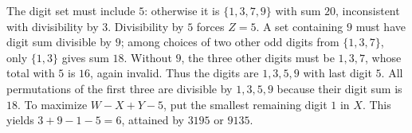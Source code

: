 The digit set must include $5$: otherwise it is $\{1,3,7,9\}$ with sum $20$, inconsistent with divisibility by $3$. Divisibility by $5$ forces $Z=5$. A set containing $9$ must have digit sum divisible by $9$; among choices of two other odd digits from $\{1,3,7\}$, only $\{1,3\}$ gives sum $18$. Without $9$, the three other digits must be $1,3,7$, whose total with $5$ is $16$, again invalid. Thus the digits are $1,3,5,9$ with last digit $5$. All permutations of the first three are divisible by $1,3,5,9$ because their digit sum is $18$. To maximize $W-X+Y-5$, put the smallest remaining digit $1$ in $X$. This yields $3+9-1-5=\boxed6$, attained by $3195$ or $9135$.
